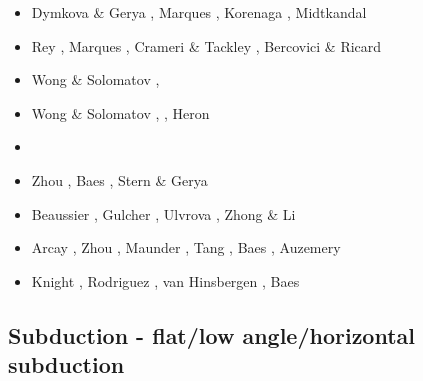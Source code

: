 \begin{scriptsize}
\begin{itemize}
\item[\twothousandthirteen] Dymkova \& Gerya \cite{dyge13}, Marques \etal \cite{mana13},
                      Korenaga \cite{kore13}, Midtkandal \etal \cite{mibg13}
\item[\twothousandfourteen] Rey \etal \cite{recf14}, Marques \etal \cite{macg14},
                      Crameri \& Tackley \cite{crta14}, Bercovici \& Ricard \cite{beri14}
\item[\twothousandfifteen] Wong \& Solomatov \cite{woso15}, \cite{matv15}
                           \cite{pebu15}\cite{vapm15}\cite{legu15}\cite{gesb15}
\item[\twothousandsixteen] Wong \& Solomatov \cite{woso16a}, \cite{crta16}
                           \cite{maka16}\cite{bags16}, Heron \etal \cite{heps16}
\item[\twothousandseventeen] \cite{magm17}
\item[\twothousandeighteen] Zhou \etal \cite{zhlg18}, Baes \etal \cite{basq18}, Stern \& Gerya \cite{stge18} 
\item[\twothousandnineteen] Beaussier \etal \cite{begb19}, Gulcher \etal \cite{gubg19}, 
                            Ulvrova \etal \cite{ulcw19}, Zhong \& Li \cite{zhli19}
\item[\twothousandtwenty] Arcay \etal \cite{arla20}, Zhou \etal \cite{zhlg20}, 
                          Maunder \etal \cite{mapg20}, Tang \etal \cite{tawm20}, 
                          Baes \etal \cite{basg20b}, Auzemery \etal \cite{auwy20}
\item[\twothousandtwentyone] Knight \etal \cite{kndc21}, Rodriguez \etal \cite{roac21},
                             van Hinsbergen \etal \cite{vasg21}, Baes \etal \cite{basg21}
\end{itemize}
\end{scriptsize}

\subsection{Subduction - flat/low angle/horizontal subduction}

